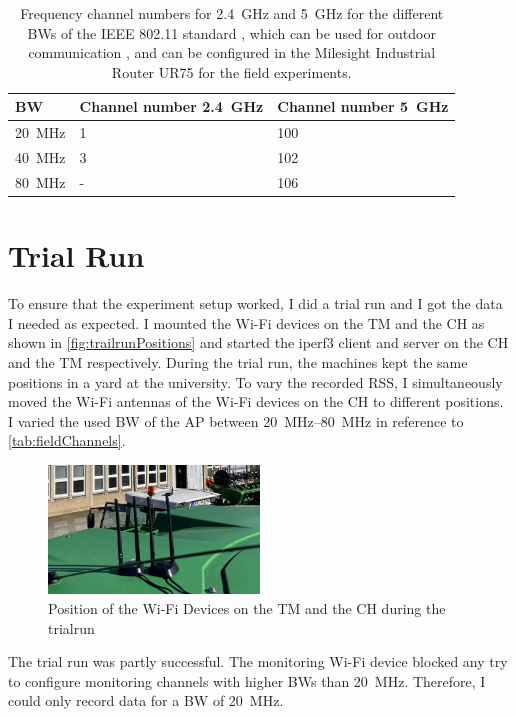 \begin{table}[H]
	\centering
	\begin{tabular}{>{\centering}p{2cm}p{4cm}p{4cm}}
		\toprule
		\ac{BW} & Channel number \SI{2.4}{\giga\hertz} & Channel number \SI{5}{\giga\hertz}\\
		\midrule
		\SI{20}{\mega\hertz} & \num{1}&
		\num{100} \\
		\SI{40}{\mega\hertz} &
		\num{3}
		& \num{102} \\
		\SI{80}{\mega\hertz} &
		- & \num{106} \\
		\bottomrule
	\end{tabular}
	\caption{Frequency channel numbers for \SI{2.4}{\giga\hertz} and \SI{5}{\giga\hertz} for the different \acfp{BW} of the IEEE 802.11 standard \cite{ieee_standard_2021ax}, which can be used for
	outdoor communication \cite{freq_plan_24G}, \cite{freq_plan_5G} and can be configured in the Milesight Industrial Router UR75 for
	the field experiments.}
	\label{tab:fieldChannels}
\end{table}

\section{Trial Run}

To ensure that the experiment setup worked, I did a trial run and I got the data I needed as expected.
I mounted the Wi-Fi devices on the \ac{TM} and the \ac{CH} as shown in \autoref{fig:trailrunPositions} and
started the iperf3 client and server on the \ac{CH} and the \ac{TM} respectively.
During the trial run, the machines kept the same positions in a yard at the university.
To vary the recorded \ac{RSS}, I simultaneously moved the Wi-Fi antennas of the Wi-Fi devices on the \ac{CH} to
different positions.
I varied the used \ac{BW} of the \ac{AP} between \SIrange{20}{80}{\mega\hertz} in reference to \autoref{tab:fieldChannels}.
\begin{figure}[H]%
   \centering
   \includegraphics[width=0.5\textwidth]{figures/trainRun}
   \caption{Position of the Wi-Fi Devices on the \ac{TM} and the \ac{CH} during the trialrun}
   \label{fig:trailrunPositions}%
\end{figure}
The trial run was partly successful.
The monitoring Wi-Fi device blocked any try to configure monitoring channels with higher \ac{BW}s than \SI{20}{\mega\hertz}.
Therefore, I could only record data for a \ac{BW} of \SI{20}{\mega\hertz}.

